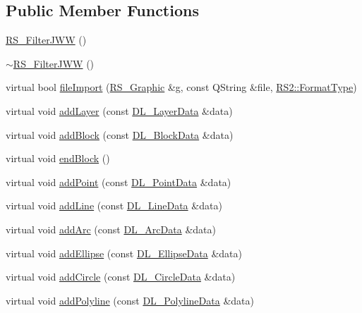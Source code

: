 \subsection*{Public Member Functions}
\begin{DoxyCompactItemize}
\item 
\hyperlink{classRS__FilterJWW_a91fe06147deca7abbbe65bb1f89dd7bd}{R\-S\-\_\-\-Filter\-J\-W\-W} ()
\item 
\hyperlink{classRS__FilterJWW_a3695121f6ae8697c2aab90c1d0dc6415}{$\sim$\-R\-S\-\_\-\-Filter\-J\-W\-W} ()
\item 
virtual bool \hyperlink{classRS__FilterJWW_a3e0d5fe4f70f9605238c46957ec1d3c4}{file\-Import} (\hyperlink{classRS__Graphic}{R\-S\-\_\-\-Graphic} \&g, const Q\-String \&file, \hyperlink{classRS2_a077a6c94c9a0ab9962c4d4a612c7189b}{R\-S2\-::\-Format\-Type})
\item 
virtual void \hyperlink{classRS__FilterJWW_af4d4424ecdef2544a1335717555003e4}{add\-Layer} (const \hyperlink{structDL__LayerData}{D\-L\-\_\-\-Layer\-Data} \&data)
\item 
virtual void \hyperlink{classRS__FilterJWW_aecab59ca7211bbd7236c88f5f393a1d1}{add\-Block} (const \hyperlink{structDL__BlockData}{D\-L\-\_\-\-Block\-Data} \&data)
\item 
virtual void \hyperlink{classRS__FilterJWW_a6ba4012a7b3e5b438681c01bf42b0da4}{end\-Block} ()
\item 
virtual void \hyperlink{classRS__FilterJWW_ae86a796f50317903e2323f73892144a5}{add\-Point} (const \hyperlink{structDL__PointData}{D\-L\-\_\-\-Point\-Data} \&data)
\item 
virtual void \hyperlink{classRS__FilterJWW_a4b2e3e43fd73b905eb40c78698098ec2}{add\-Line} (const \hyperlink{structDL__LineData}{D\-L\-\_\-\-Line\-Data} \&data)
\item 
virtual void \hyperlink{classRS__FilterJWW_a2c7dffe5f5c67f0ff55f4244b3d1f85f}{add\-Arc} (const \hyperlink{structDL__ArcData}{D\-L\-\_\-\-Arc\-Data} \&data)
\item 
virtual void \hyperlink{classRS__FilterJWW_abfe3f09bff89ab5c326a3aee7ac50b1c}{add\-Ellipse} (const \hyperlink{structDL__EllipseData}{D\-L\-\_\-\-Ellipse\-Data} \&data)
\item 
virtual void \hyperlink{classRS__FilterJWW_a9e9a9db905c6d9a56ec8ec75170b1913}{add\-Circle} (const \hyperlink{structDL__CircleData}{D\-L\-\_\-\-Circle\-Data} \&data)
\item 
virtual void \hyperlink{classRS__FilterJWW_a1ab269904461475c6feb7bff73163bd2}{add\-Polyline} (const \hyperlink{structDL__PolylineData}{D\-L\-\_\-\-Polyline\-Data} \&data)

\end{DoxyCompactItemize}
